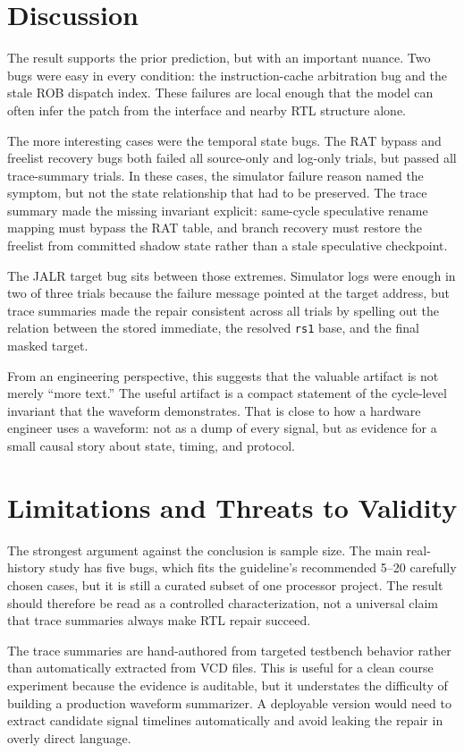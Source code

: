 \documentclass[11pt]{article}
\begin{document}
\section*{Discussion}
The result supports the prior prediction, but with an important nuance. Two
bugs were easy in every condition: the instruction-cache arbitration bug and
the stale ROB dispatch index. These failures are local enough that the model can
often infer the patch from the interface and nearby RTL structure alone.

The more interesting cases were the temporal state bugs. The RAT bypass and
freelist recovery bugs both failed all source-only and log-only trials, but
passed all trace-summary trials. In these cases, the simulator failure reason
named the symptom, but not the state relationship that had to be preserved. The
trace summary made the missing invariant explicit: same-cycle speculative
rename mapping must bypass the RAT table, and branch recovery must restore the
freelist from committed shadow state rather than a stale speculative
checkpoint.

The JALR target bug sits between those extremes. Simulator logs were enough in
two of three trials because the failure message pointed at the target address,
but trace summaries made the repair consistent across all trials by spelling out
the relation between the stored immediate, the resolved \texttt{rs1} base, and
the final masked target.

From an engineering perspective, this suggests that the valuable artifact is
not merely ``more text.'' The useful artifact is a compact statement of the
cycle-level invariant that the waveform demonstrates. That is close to how a
hardware engineer uses a waveform: not as a dump of every signal, but as
evidence for a small causal story about state, timing, and protocol.

\section*{Limitations and Threats to Validity}
The strongest argument against the conclusion is sample size. The main
real-history study has five bugs, which fits the guideline's recommended
5--20 carefully chosen cases, but it is still a curated subset of one processor
project. The result should therefore be read as a controlled characterization,
not a universal claim that trace summaries always make RTL repair succeed.

The trace summaries are hand-authored from targeted testbench behavior rather
than automatically extracted from VCD files. This is useful for a clean course
experiment because the evidence is auditable, but it understates the difficulty
of building a production waveform summarizer. A deployable version would need
to extract candidate signal timelines automatically and avoid leaking the repair
in overly direct language.
\end{document}
